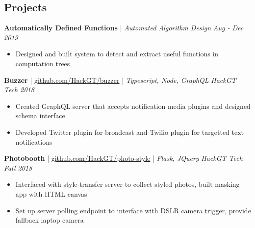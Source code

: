 \subsection*{Projects}
\iftoggle{research}{
    \headerrow
        {\textbf{Perturbome of Graphs of RNNs}}
        {\emph{Sep - Nov 2020}}
    \begin{itemize}
        \item Experimented with network robustness by noising recurrent networks built with \textsc{pytorch-geometric}
    \end{itemize}
    \headerrow
        {\textbf{BERT Representations During Fine-Tuning}}
        {\emph{Sep - Nov 2020}}
    \begin{itemize}
        \item Studied changes in the BERT model during fine-tuning and forgetting using representational analysis
    \end{itemize}
}{}
\headerrow
    {\textbf{Automatically Defined Functions} | \textit{Automated Algorithm Design}}
    {\emph{Aug - Dec 2019}}
\begin{itemize}
    \item Designed and built system to detect and extract useful functions in computation trees%
\end{itemize}
\iftoggle{dense}{}{
    \headerrow
        {\textbf{Filter Inverter} | \href{https://team-vision2020.github.io}{team-vision2020.github.io}}
        {\emph{Oct - Nov 2018}}
    \begin{itemize}
        \item Unfilter Instagram filters using detection and pseudo-inversion. Created demo combining all models
        \item Designed voting procedure that used nearest neighbor classifier on generated knowledge base
    \end{itemize}
}
\headerrow
    {\textbf{Buzzer} | \href{https://github.com/HackGT/buzzer}{github.com/HackGT/buzzer} |
    \textit{Typescript, Node, GraphQL}}
    {\emph{HackGT Tech 2018}}
\begin{itemize}
    \item Created GraphQL server that accepts notification media plugins and designed schema interface
    \item Developed Twitter plugin for broadcast and Twilio plugin for targetted text notifications
\end{itemize}
\headerrow
    {\textbf{Photobooth} | \href{https://github.com/HackGT/photo-style}{github.com/HackGT/photo-style} |
    \textit{Flask, JQuery}}
    {\emph{HackGT Tech Fall 2018}}
\begin{itemize}
    \item Interfaced with style-transfer server to collect styled photos, built masking app with HTML canvas
    \item Set up server polling endpoint to interface with DSLR camera trigger, provide fallback laptop camera
\end{itemize}

